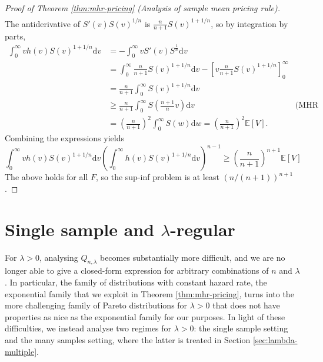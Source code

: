 \documentclass[11pt]{article}
\newcommand{\E}{\mathbb{E}}
\newcommand{\dd}{\mathrm{d}}
\begin{document}
\begin{proof}[Proof of Theorem \ref{thm:mhr-pricing} (Analysis of sample mean pricing rule)]
\begin{align*}
    \end{align*}
    The antiderivative of $S'(v)S(v)^{1/n}$ is $\frac{n}{n+1}S(v)^{1+1/n}$, so by integration by parts,
    \begin{align*}
        \int_0^\infty vh(v)S(v)^{1+1/n}\dd v&=-\int_0^\infty v S'(v)S^{\frac{1}{n}}\dd v\\
        &= \int_0^\infty \frac{n}{n+1}S(v)^{1+1/n}\dd v-\left[v\frac{n}{n+1}S(v)^{1+1/n}\right]_0^\infty\\
        &=  \frac{n}{n+1} \int_0^\infty S(v)^{1+1/n}\dd v\\
        &\ge \frac{n}{n+1}\int_0^\infty S\left(\frac{n+1}{n}v\right)\dd v&\text{(MHR )} \\
        &=\left(\frac{n}{n+1}\right)^2\int_0^\infty S(w)\dd w=\left(\frac{n}{n+1}\right)^2\E[V].
    \end{align*}
    Combining the expressions yields
    $$
        \int_0^\infty v h(v)S(v)^{1+1/n}\dd v\left(\int_0^\infty h(v)S(v)^{1+1/n}\dd v\right)^{n-1}\ge \left(\frac{n}{n+1}\right)^{n+1}\E[V]
    $$
    The above holds for all $F$, so the sup-inf problem is at least $\left(n/(n+1)\right)^{n+1}$.
    
\end{proof}


\section{Single sample and \texorpdfstring{$\lambda$}{lambda}-regular}
\label{sec:lambda-single}
For $\lambda>0$, analysing $Q_{n,\lambda}$ becomes substantially more difficult, and we are no longer able to give a closed-form expression for arbitrary combinations of $n$ and $\lambda$. In particular, the family of distributions with constant hazard rate, the exponential family that we exploit in Theorem \ref{thm:mhr-pricing}, turns into the more challenging family of Pareto distributions for $\lambda > 0$ that does not have properties as nice as the exponential family for our purposes.
In light of these difficulties, we instead analyse two regimes for $\lambda > 0$: the single sample setting and the many samples setting, where the latter is treated in Section \ref{sec:lambda-multiple}. 
\end{document}
